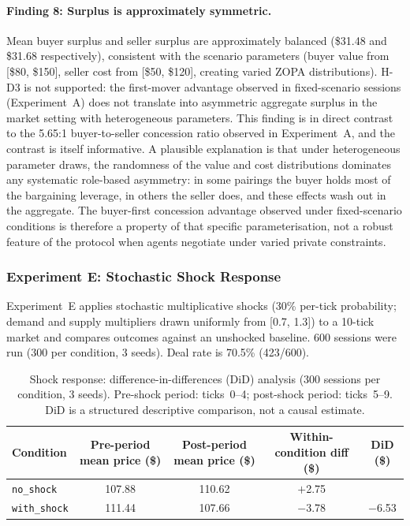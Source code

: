 \paragraph{Finding 8: Surplus is approximately symmetric.}
Mean buyer surplus and seller surplus are approximately balanced (\$31.48 and \$31.68 respectively), consistent with the scenario parameters (buyer value from [\$80, \$150], seller cost from [\$50, \$120], creating varied ZOPA distributions).  H-D3 is not supported: the first-mover advantage observed in fixed-scenario sessions (Experiment~A) does not translate into asymmetric aggregate surplus in the market setting with heterogeneous parameters.  This finding is in direct contrast to the 5.65:1 buyer-to-seller concession ratio observed in Experiment~A, and the contrast is itself informative.  A plausible explanation is that under heterogeneous parameter draws, the randomness of the value and cost distributions dominates any systematic role-based asymmetry: in some pairings the buyer holds most of the bargaining leverage, in others the seller does, and these effects wash out in the aggregate.  The buyer-first concession advantage observed under fixed-scenario conditions is therefore a property of that specific parameterisation, not a robust feature of the protocol when agents negotiate under varied private constraints.

\subsubsection{Experiment E: Stochastic Shock Response}
\label{sec:results-shock}

Experiment~E applies stochastic multiplicative shocks (30\% per-tick probability; demand and supply multipliers drawn uniformly from [0.7, 1.3]) to a 10-tick market and compares outcomes against an unshocked baseline.  600 sessions were run (300 per condition, 3 seeds).  Deal rate is 70.5\% (423/600).

\begin{table}[ht]
\centering
\caption{Shock response: difference-in-differences (DiD) analysis (300 sessions per condition, 3 seeds).  Pre-shock period: ticks~0--4; post-shock period: ticks~5--9.  DiD is a structured descriptive comparison, not a causal estimate.}
\label{tab:shock}
\begin{tabular}{@{}lcccc@{}}
\toprule
Condition & Pre-period mean price (\$) & Post-period mean price (\$) & Within-condition diff (\$) & DiD (\$) \\
\midrule
\texttt{no\_shock}   & 107.88 & 110.62 & $+$2.75 & \\
\texttt{with\_shock} & 111.44 & 107.66 & $-$3.78 & $-$6.53 \\
\bottomrule
\end{tabular}
\end{table}

